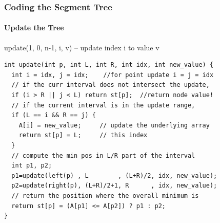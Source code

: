 \begin{frame}[fragile]
  \frametitle{Coding the Segment Tree}
  \framesubtitle{Update the Tree}

{\smaller
\begin{block}{update(1, 0, n-1, i, v) -- update index i to value v}
\begin{verbatim}
int update(int p, int L, int R, int idx, int new_value) {
  int i = idx, j = idx;    //for point update i = j = idx
  // if the curr interval does not intersect the update,
  if (i > R || j < L) return st[p];  //return node value!
  // if the current interval is in the update range,
  if (L == i && R == j) {
    A[i] = new_value;     // update the underlying array
    return st[p] = L;     // this index
  }
  // compute the min pos in L/R part of the interval
  int p1, p2;
  p1=update(left(p) , L        , (L+R)/2, idx, new_value);
  p2=update(right(p), (L+R)/2+1, R      , idx, new_value);
  // return the position where the overall minimum is
  return st[p] = (A[p1] <= A[p2]) ? p1 : p2;
}
\end{verbatim}
\end{block}}
\end{frame}
